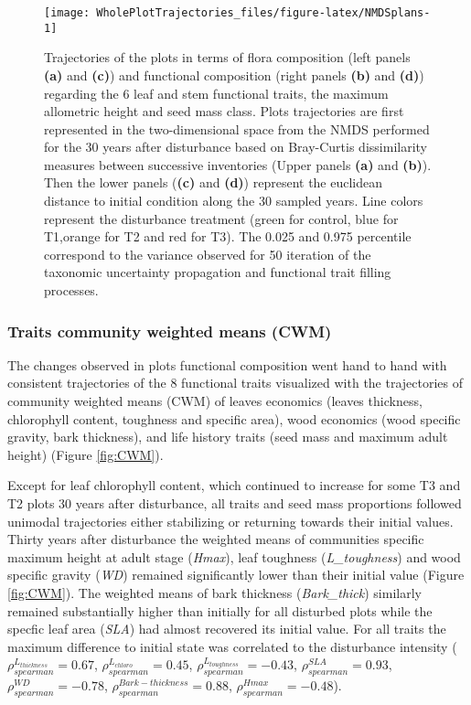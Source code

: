 \documentclass[fleqn,10pt]{ArtEcoFoG} %
\theoremstyle{definition}
\theoremstyle{definition}
\theoremstyle{definition}
\theoremstyle{remark}
\begin{document}
\begin{figure*}

{\centering \texttt{[image: WholePlotTrajectories\_files/figure-latex/NMDSplans-1]} 

}

\caption{Trajectories of the plots in terms of flora composition (left panels \textbf{(a)} and \textbf{(c)}) and functional composition (right panels \textbf{(b)} and \textbf{(d)}) regarding the 6 leaf and stem functional traits, the maximum allometric height and seed mass class. Plots trajectories are first represented in the two-dimensional space from the NMDS performed for the 30 years after disturbance based on Bray-Curtis dissimilarity measures between successive inventories (Upper panels \textbf{(a)} and \textbf{(b)}). Then the lower panels (\textbf{(c)} and \textbf{(d)}) represent the euclidean distance to initial condition along the 30 sampled years. Line colors represent the disturbance treatment (green for control, blue for T1,orange for T2 and red for T3). The 0.025 and 0.975 percentile correspond to the variance observed for 50 iteration of the taxonomic uncertainty propagation and functional trait filling processes.}\label{fig:NMDSplans}
\end{figure*}

\subsubsection{Traits community weighted means
(CWM)}\label{traits-community-weighted-means-cwm}

The changes observed in plots functional composition went hand to hand
with consistent trajectories of the 8 functional traits
visualized with the trajectories of community weighted means (CWM) of
leaves economics (leaves thickness, chlorophyll content, toughness and
specific area), wood economics (wood specific gravity, bark thickness),
and life history traits (seed mass and maximum adult height) (Figure
\ref{fig:CWM}).

Except for leaf chlorophyll content, which continued to increase for
some T3 and T2 plots 30 years after disturbance, all traits and seed
mass proportions followed unimodal trajectories either stabilizing or
returning towards their initial values. Thirty years after disturbance
the weighted means of communities specific maximum height at adult stage
(\emph{Hmax}), leaf toughness (\emph{L\_toughness}) and wood specific
gravity (\emph{WD}) remained significantly lower than their initial
value (Figure \ref{fig:CWM}). The weighted means of bark thickness
(\emph{Bark\_thick}) similarly remained substantially higher than
initially for all disturbed plots while the specfic leaf area
(\emph{SLA}) had almost recovered its initial value. For all traits the
maximum difference to initial state was correlated to the disturbance
intensity (\(\rho_{spearman}^{L_{thickness}}=0.67\),
\(\rho_{spearman}^{L_{chloro}}=0.45\),
\(\rho_{spearman}^{L_{toughness}}=-0.43\),
\(\rho_{spearman}^{SLA}=0.93\), \(\rho_{spearman}^{WD}=-0.78\),
\(\rho_{spearman}^{Bark-thickness}=0.88\),
\(\rho_{spearman}^{Hmax}=-0.48\)).
\end{document}
